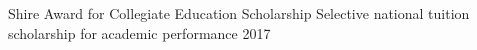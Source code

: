 \begin{cvhonors}
  \cvhonor
    {Shire Award for Collegiate Education Scholarship} %
    {Selective national tuition scholarship for academic performance} %
    {} %
    {2017} %


    


\end{cvhonors}







